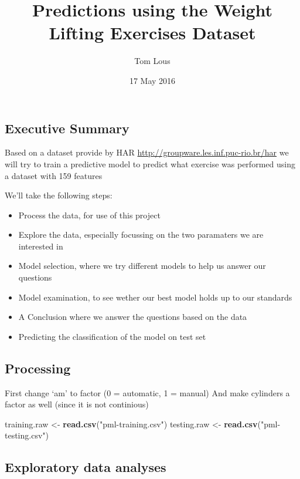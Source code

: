 \documentclass[]{article}
\title{Predictions using the Weight Lifting Exercises Dataset}
\author{Tom Lous}
\date{17 May 2016}
\newenvironment{Shaded}{\begin{snugshade}}{\end{snugshade}}
\newcommand{\KeywordTok}[1]{\textcolor[rgb]{0.13,0.29,0.53}{\textbf{#1}}}
\newcommand{\NormalTok}[1]{#1}
\newcommand{\StringTok}[1]{\textcolor[rgb]{0.31,0.60,0.02}{#1}}
\providecommand{\tightlist}{%
  \setlength{\itemsep}{0pt}\setlength{\parskip}{0pt}}
\begin{document}
\maketitle

\hypertarget{executive-summary}{%
\subsection{Executive Summary}\label{executive-summary}}

Based on a dataset provide by HAR
\url{http://groupware.les.inf.puc-rio.br/har} we will try to train a
predictive model to predict what exercise was performed using a dataset
with 159 features

We'll take the following steps:

\begin{itemize}
\tightlist
\item
  Process the data, for use of this project
\item
  Explore the data, especially focussing on the two paramaters we are
  interested in
\item
  Model selection, where we try different models to help us answer our
  questions
\item
  Model examination, to see wether our best model holds up to our
  standards
\item
  A Conclusion where we answer the questions based on the data
\item
  Predicting the classification of the model on test set
\end{itemize}

\hypertarget{processing}{%
\subsection{Processing}\label{processing}}

First change `am' to factor (0 = automatic, 1 = manual) And make
cylinders a factor as well (since it is not continious)

\begin{Shaded}
\begin{Highlighting}[]
\NormalTok{training.raw <-}\StringTok{ }\KeywordTok{read.csv}\NormalTok{(}\StringTok{"pml-training.csv"}\NormalTok{)}
\NormalTok{testing.raw <-}\StringTok{ }\KeywordTok{read.csv}\NormalTok{(}\StringTok{"pml-testing.csv"}\NormalTok{)}
\end{Highlighting}
\end{Shaded}

\hypertarget{exploratory-data-analyses}{%
\subsection{Exploratory data analyses}\label{exploratory-data-analyses}}
\end{document}
